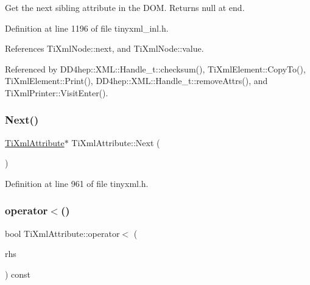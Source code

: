 Get the next sibling attribute in the D\+OM. Returns null at end. 



Definition at line 1196 of file tinyxml\+\_\+inl.\+h.



References Ti\+Xml\+Node\+::next, and Ti\+Xml\+Node\+::value.



Referenced by D\+D4hep\+::\+X\+M\+L\+::\+Handle\+\_\+t\+::checksum(), Ti\+Xml\+Element\+::\+Copy\+To(), Ti\+Xml\+Element\+::\+Print(), D\+D4hep\+::\+X\+M\+L\+::\+Handle\+\_\+t\+::remove\+Attrs(), and Ti\+Xml\+Printer\+::\+Visit\+Enter().

\hypertarget{class_ti_xml_attribute_a138320aa7793b148ba7e5bd0a0ea4db6}{}\label{class_ti_xml_attribute_a138320aa7793b148ba7e5bd0a0ea4db6} 
\subsubsection{\texorpdfstring{Next()}{Next()}\hspace{0.1cm}{\footnotesize\ttfamily [2/2]}}
{\footnotesize\ttfamily \hyperlink{class_ti_xml_attribute}{Ti\+Xml\+Attribute}$\ast$ Ti\+Xml\+Attribute\+::\+Next (\begin{DoxyParamCaption}{ }\end{DoxyParamCaption})\hspace{0.3cm}{\ttfamily [inline]}}



Definition at line 961 of file tinyxml.\+h.

\hypertarget{class_ti_xml_attribute_a80dcb758cc5ab27ce9865301e2da1335}{}\label{class_ti_xml_attribute_a80dcb758cc5ab27ce9865301e2da1335} 
\subsubsection{\texorpdfstring{operator$<$()}{operator<()}}
{\footnotesize\ttfamily bool Ti\+Xml\+Attribute\+::operator$<$ (\begin{DoxyParamCaption}\item[{const \hyperlink{class_ti_xml_attribute}{Ti\+Xml\+Attribute} \&}]{rhs }\end{DoxyParamCaption}) const\hspace{0.3cm}{\ttfamily [inline]}}



